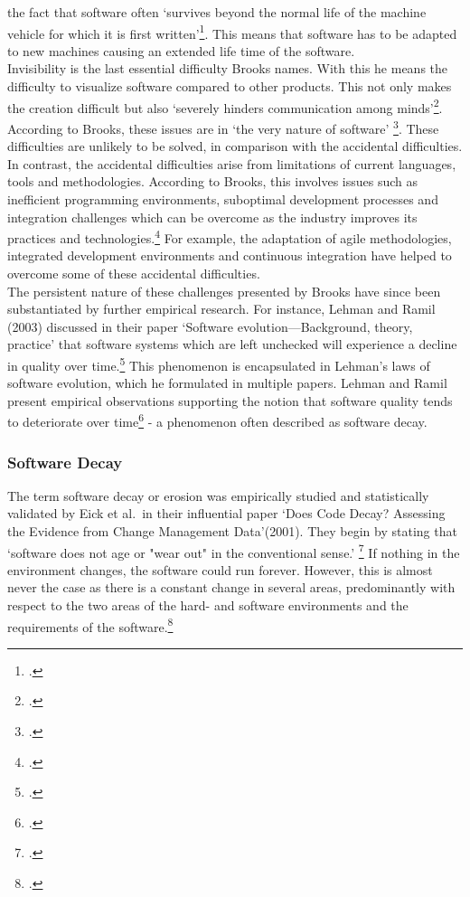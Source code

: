 the fact that software often `survives beyond the normal life of the machine vehicle for which it is first written'\footcite[4]{brooksNoSilverBullet1987}. This means that software has to be adapted to new machines causing an extended life time of the software.\\
Invisibility is the last essential difficulty Brooks names. With this he means the difficulty to visualize software compared to other products. This not only makes the creation difficult but also `severely hinders communication among minds'\footcite[4]{brooksNoSilverBullet1987}.
According to Brooks, these issues are in `the very nature of software' \footcite[2]{brooksNoSilverBullet1987}. These difficulties are unlikely to be solved, in comparison with the accidental difficulties.\\

In contrast, the accidental difficulties arise from limitations of current languages, tools and methodologies. According to Brooks, this involves issues such as inefficient programming environments, suboptimal development processes and integration challenges which can be overcome as the industry improves its practices and technologies.\footcite[5-6]{brooksNoSilverBullet1987}
For example, the adaptation of agile methodologies, integrated development environments and continuous integration have helped to overcome some of these accidental difficulties.\\

The persistent nature of these challenges presented by Brooks have since been substantiated by further empirical research. For instance, Lehman and Ramil (2003) discussed in their paper `Software evolution—Background, theory, practice' that software systems which are left unchecked will experience a decline in quality over time.\footcite[34]{lehmanSoftwareEvolutionBackground2003}
This phenomenon is encapsulated in Lehman's laws of software evolution, which he formulated in multiple papers.  Lehman and Ramil present empirical observations supporting the notion that software quality tends to deteriorate over time\footcite[42]{lehmanSoftwareEvolutionBackground2003} - a phenomenon often described as
software decay.

\subsubsection{Software Decay}
The term software decay or erosion was empirically studied and statistically validated by Eick et al.\ in their influential paper `Does Code Decay? Assessing the Evidence from Change Management Data'(2001). They begin by stating that `software does not age or "wear out" in the conventional sense.' \footcite[1]{eickDoesCodeDecay2001}
If nothing in the environment changes, the software could run forever. However, this is almost never the case as there is a constant change in several areas, predominantly with respect to the two areas of the hard- and software environments and the requirements of the software.\footcite[1]{eickDoesCodeDecay2001}\\

